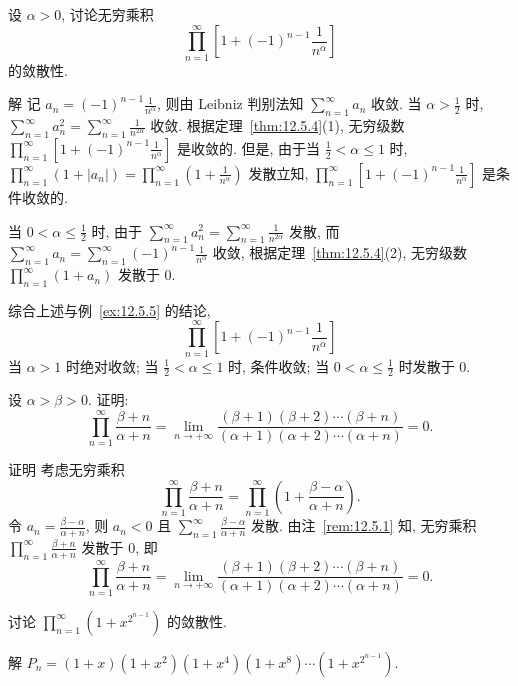 \begin{example}\label{ex:12.5.6}
设 $\alpha>0$, 讨论无穷乘积
\[
  \prod_{n=1}^{\infty}\left[1+(-1)^{n-1}\frac{1}{n^{\alpha}}\right]
\]
的敛散性.
\end{example}

解 记 $a_{n}=(-1)^{n-1}\frac{1}{n^{\alpha}}$, 则由 Leibniz 判别法知 $\sum_{n=1}^{\infty}a_{n}$ 收敛. 当 $\alpha>\frac{1}{2}$ 时, $\sum_{n=1}^{\infty}a_{n}^{2}=\sum_{n=1}^{\infty}\frac{1}{n^{2\alpha}}$ 收敛. 根据定理~\ref{thm:12.5.4}(1), 无穷级数 $\prod_{n=1}^{\infty}\left[1+(-1)^{n-1}\frac{1}{n^{\alpha}}\right]$ 是收敛的. 但是, 由于当 $\frac{1}{2}<\alpha\leqslant1$ 时, $\prod_{n=1}^{\infty}(1+|a_{n}|)=\prod_{n=1}^{\infty}\left(1+\frac{1}{n^{\alpha}}\right)$ 发散立知, $\prod_{n=1}^{\infty}\left[1+(-1)^{n-1}\frac{1}{n^{\alpha}}\right]$ 是条件收敛的.

当 $0<\alpha\leqslant\frac{1}{2}$ 时, 由于 $\sum_{n=1}^{\infty}a_{n}^{2}=\sum_{n=1}^{\infty}\frac{1}{n^{2\alpha}}$ 发散, 而 $\sum_{n=1}^{\infty}a_{n}=\sum_{n=1}^{\infty}(-1)^{n-1}\frac{1}{n^{\alpha}}$ 收敛, 根据定理~\ref{thm:12.5.4}(2), 无穷级数 $\prod_{n=1}^{\infty}(1+a_{n})$ 发散于 $0$.

综合上述与例~\ref{ex:12.5.5} 的结论,
\[
  \prod_{n=1}^{\infty}\left[1+(-1)^{n-1}\frac{1}{n^{\alpha}}\right]
\]
当 $\alpha>1$ 时绝对收敛; 当 $\frac{1}{2}<\alpha\leqslant1$ 时, 条件收敛; 当 $0<\alpha\leqslant\frac{1}{2}$ 时发散于 $0$.

\begin{example}\label{ex:12.5.7}
设 $\alpha>\beta>0$. 证明:
\[
  \prod_{n=1}^{\infty}\frac{\beta+n}{\alpha+n}=\lim_{n\to+\infty}\frac{(\beta+1)(\beta+2)\cdots(\beta+n)}{(\alpha+1)(\alpha+2)\cdots(\alpha+n)}=0.
\]
\end{example}

证明 考虑无穷乘积
\[
  \prod_{n=1}^{\infty}\frac{\beta+n}{\alpha+n}=\prod_{n=1}^{\infty}\left(1+\frac{\beta-\alpha}{\alpha+n}\right).
\]
令 $a_{n}=\frac{\beta-\alpha}{\alpha+n}$, 则 $a_{n}<0$ 且 $\sum_{n=1}^{\infty}\frac{\beta-\alpha}{\alpha+n}$ 发散. 由注~\ref{rem:12.5.1} 知, 无穷乘积 $\prod_{n=1}^{\infty}\frac{\beta+n}{\alpha+n}$ 发散于 $0$, 即
\[
  \prod_{n=1}^{\infty}\frac{\beta+n}{\alpha+n}=\lim_{n\to+\infty}\frac{(\beta+1)(\beta+2)\cdots(\beta+n)}{(\alpha+1)(\alpha+2)\cdots(\alpha+n)}=0.
\]

\begin{example}\label{ex:12.5.8}
讨论 $\prod_{n=1}^{\infty}(1+x^{2^{n-1}})$ 的敛散性.
\end{example}

解 $P_{n}=(1+x)(1+x^{2})(1+x^{4})(1+x^{8})\cdots(1+x^{2^{n-1}})$.


